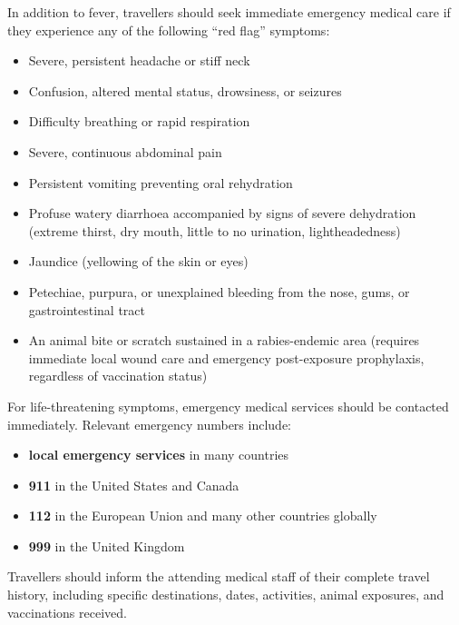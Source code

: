 In addition to fever, travellers should seek immediate emergency medical care if they experience any of the following ``red flag'' symptoms:
\begin{itemize}
    \item Severe, persistent headache or stiff neck
    \item Confusion, altered mental status, drowsiness, or seizures
    \item Difficulty breathing or rapid respiration
    \item Severe, continuous abdominal pain
    \item Persistent vomiting preventing oral rehydration
    \item Profuse watery diarrhoea accompanied by signs of severe dehydration (extreme thirst, dry mouth, little to no urination, lightheadedness)
    \item Jaundice (yellowing of the skin or eyes)
    \item Petechiae, purpura, or unexplained bleeding from the nose, gums, or gastrointestinal tract
    \item An animal bite or scratch sustained in a rabies-endemic area (requires immediate local wound care and emergency post-exposure prophylaxis, regardless of vaccination status)
\end{itemize}
For life-threatening symptoms, emergency medical services should be contacted immediately. Relevant emergency numbers include:
\begin{itemize}
    \item \textbf{local emergency services} in many countries
    \item \textbf{911} in the United States and Canada
    \item \textbf{112} in the European Union and many other countries globally
    \item \textbf{999} in the United Kingdom
\end{itemize}
Travellers should inform the attending medical staff of their complete travel history, including specific destinations, dates, activities, animal exposures, and vaccinations received.

